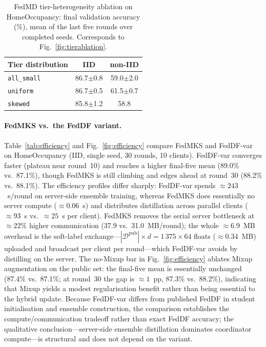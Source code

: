 \documentclass[conference]{IEEEtran}
\begin{document}
\begin{table}[t]
\centering\small
\caption{FedMD tier-heterogeneity ablation on HomeOccupancy: final
  validation accuracy (\%), mean of the last five rounds over completed
  seeds.  Corresponds to Fig.~\ref{fig:tierablation}.}
\label{tab:tierscores}
\setlength{\tabcolsep}{6pt}
\begin{tabular}{@{}lcc@{}}
\toprule
\textbf{Tier distribution} & \textbf{IID} & \textbf{non-IID}\\
\midrule
\texttt{all\_small} & 86.7$\pm$0.8 & 59.0$\pm$2.0 \\
\texttt{uniform} & 86.7$\pm$0.5 & 61.5$\pm$0.7 \\
\texttt{skewed} & 85.8$\pm$1.2 & 58.8 \\
\bottomrule
\end{tabular}
\end{table}

\paragraph{FedMKS vs.\ the FedDF variant.}
Table~\ref{tab:efficiency} and Fig.~\ref{fig:efficiency} compare FedMKS
and FedDF-var on HomeOccupancy (IID, single seed, 30 rounds, 10
clients).  FedDF-var converges faster (plateau near round~10) and
reaches a higher final-five mean (89.0\% vs.\ 87.1\%), though FedMKS
is still climbing and edges ahead at round~30 (88.2\% vs.\ 88.1\%).  The efficiency profiles differ sharply: FedDF-var
spends ${\approx}243$~s/round on server-side ensemble training, whereas
FedMKS does essentially no server compute (${\approx}0.06$~s) and
distributes distillation across parallel clients (${\approx}93$~s vs.\
${\approx}25$~s per client).  FedMKS removes the serial server bottleneck
at ${\approx}22\%$ higher communication (37.9 vs.\ 31.0~MB/round);
the whole ${\approx}6.9$~MB overhead is the soft-label
exchange---$|\mathcal{D}^{\text{pub}}|{\times}d = 1\,375{\times}64$
floats (${\approx}0.34$~MB) uploaded and broadcast per client per
round---which FedDF-var avoids by distilling on the server.  The
no-Mixup bar in Fig.~\ref{fig:efficiency} ablates Mixup augmentation on
the public set: the final-five mean is essentially unchanged (87.4\%
vs.\ 87.1\%; at round~30 the gap is ${\approx}1$~pp, 87.3\% vs.\
88.2\%), indicating that Mixup yields a modest regularisation benefit
rather than being essential to the hybrid update.  Because
FedDF-var differs from published FedDF in student initialisation
and ensemble construction, the comparison establishes the
compute/communication tradeoff rather than exact FedDF accuracy;
the qualitative conclusion---server-side ensemble distillation
dominates coordinator compute---is structural and does not depend
on the variant.
\end{document}
